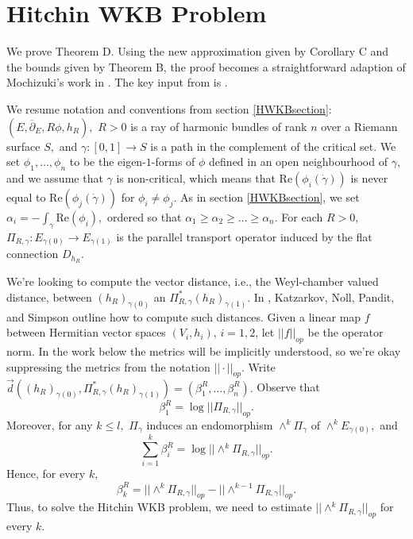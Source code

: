 \documentclass[10pt]{amsart}
\theoremstyle{definition}
\begin{document}
\appendix

\section{Hitchin WKB Problem}

We prove Theorem D. Using the new approximation given by Corollary C and the bounds given by Theorem B, the proof becomes a straightforward adaption of Mochizuki's work in \cite{Mo}. The key input from \cite{Mo} is \cite[Corollary 2.19]{Mo}. 



We resume notation and conventions from section \ref{HWKBsection}: $(E,\overline{\partial}_E,R\phi,h_R),$ $R>0$ is a ray of harmonic bundles of rank $n$ over a Riemann surface $S,$ and $\gamma:[0,1]\to S$ is a path in the complement of the critical set. We set $\phi_1,\dots, \phi_n$ to be the eigen-$1$-forms of $\phi$ defined in an open neighbourhood of $\gamma$, and we assume that $\gamma$ is non-critical, which means that $\mathrm{Re}(\phi_i(\dot{\gamma}))$ is never equal to $\mathrm{Re}(\phi_j(\dot{\gamma}))$ for $\phi_i\neq \phi_j$. As in section \ref{HWKBsection}, we set $\alpha_i=-\int_\gamma \textrm{Re}(\phi_i),$ ordered so that $\alpha_1\geq \alpha_2\geq \dots \geq \alpha_n.$ For each $R>0,$  $\Pi_{R,\gamma}: E_{\gamma(0)}\to E_{\gamma(1)}$ is the parallel transport operator induced by the flat connection $D_{h_R}$.

We're looking to compute the vector distance, i.e., the Weyl-chamber valued distance, between $(h_R)_{\gamma(0)}$ an $\Pi_{R,\gamma}^*(h_R)_{\gamma(1)}$. In \cite[section 1]{KNPS}, Katzarkov, Noll, Pandit, and Simpson outline how to compute such distances. Given a linear map $f$ between Hermitian vector spaces $(V_i,h_i)$, $i=1,2$, let $||f||_{op}$ be the operator norm. In the work below the metrics will be implicitly understood, so we're okay suppressing the metrics from the notation $||\cdot||_{op}.$ Write $\vec{d}((h_R)_{\gamma(0)},\Pi_{R,\gamma}^*(h_R)_{\gamma(1)})=(\beta_1^R,\dots, \beta_n^R).$ Observe that 
\begin{equation}\label{beta1formula}
    \beta_1^R = \log ||\Pi_{R,\gamma}||_{op}.
\end{equation}
Moreover, for any $k\leq l,$ $\Pi_\gamma$ induces an endomorphism $\wedge^k\Pi_\gamma$ of $\wedge^k E_{\gamma(0)},$ and 
\begin{equation}\label{betakformula}
    \sum_{i=1}^k\beta_i^R = \log ||\wedge^k\Pi_{R,\gamma}||_{op}.
\end{equation}
Hence, for every $k,$ 
\begin{equation}\label{differenceeq}
    \beta_k^R = ||\wedge^k\Pi_{R,\gamma}||_{op}- ||\wedge^{k-1}\Pi_{R,\gamma}||_{op}.
\end{equation}
Thus, to solve the Hitchin WKB problem, we need to estimate $||\wedge^k\Pi_{R,\gamma}||_{op}$ for every $k.$ 
\end{document}
